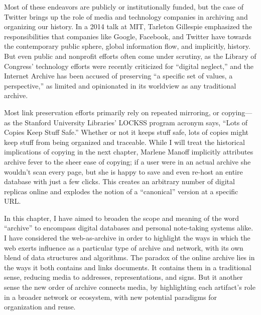 
Most of these endeavors are publicly or institutionally funded, but the case of Twitter brings up the role of media and technology companies in archiving and organizing our history. In a 2014 talk at MIT, Tarleton Gillespie emphasized the responsibilities that companies like Google, Facebook, and Twitter have towards the contemporary public sphere, global information flow, and implicitly, history.\autocite{whitacre_podcast:_2014} But even public and nonprofit efforts often come under scrutiny, as the Library of Congress' technology efforts were recently criticized for ``digital neglect,'' and the Internet Archive has been accused of preserving ``a specific set of values, a perspective,'' as limited and opinionated in its worldview as any traditional archive.\autocites{the_editorial_board_digital_2015}{abreu_collection_2015}

Most link preservation efforts primarily rely on repeated mirroring, or copying---as the Stanford University Libraries' LOCKSS program acronym says, ``Lots of Copies Keep Stuff Safe.''\autocite[2778]{zittrain_fourth_2010} Whether or not it keeps stuff safe, lots of copies might keep stuff from being organized and traceable. While I will treat the historical implications of copying in the next chapter, Marlene Manoff implicitly attributes archive fever to the sheer ease of copying; if a user were in an actual archive she wouldn't scan every page, but she is happy to save and even re-host an entire database with just a few clicks.\autocite[386]{manoff_archive_2010} This creates an arbitrary number of digital replicas online and explodes the notion of a ``canonical'' version at a specific URL.

In this chapter, I have aimed to broaden the scope and meaning of the word ``archive'' to encompass digital databases and personal note-taking systems alike. I have considered the web-as-archive in order to highlight the ways in which the web exerts influence as a particular type of archive and network, with its own blend of data structures and algorithms. The paradox of the online archive lies in the ways it both contains and links documents. It contains them in a traditional sense, reducing media to addresses, representations, and signs. But it another sense the new order of archive connects media, by highlighting each artifact's role in a broader network or ecosystem, with new potential paradigms for organization and reuse.
